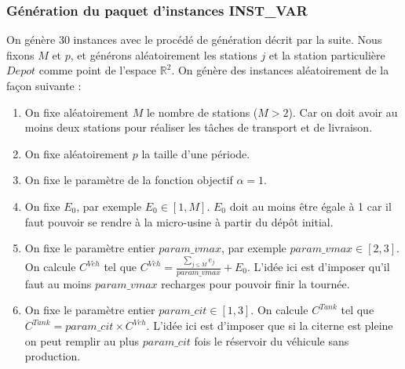 {\subsubsection{Génération du paquet d'instances INST\_VAR}
On génère 30 instances avec le procédé de génération décrit par la suite.
 Nous fixons $M$ et $p$, et générons aléatoirement les stations $j$ et la station particulière $Depot$ comme point de l'espace $\mathbb{R}^2$.  
 On génère des instances aléatoirement de la façon suivante :

\begin{enumerate}
	\item On fixe aléatoirement $M$ le nombre de stations ($M>2$). Car on doit avoir au moins deux stations pour réaliser les tâches de transport et de livraison.
	\item On fixe aléatoirement $p$ la taille d'une période.
	\item On fixe le paramètre de la fonction objectif $\alpha=1$.%
	\item On fixe $E_0$, par exemple $E_0 \in [1, M]$. $E_0$ doit au moins être égale à 1 car il faut pouvoir se rendre à la micro-usine à partir du dépôt initial.
	\item On fixe le paramètre entier $param\_vmax$, par exemple $param\_vmax \in [2,3]$. On calcule $C^{Veh}$ tel que $C^{Veh}= \frac{\sum_{j \leq M} e_j }{ param\_vmax} +E_0$. L'idée ici est d'imposer qu'il faut au moins $param\_vmax$ recharges pour pouvoir finir la tournée.
	\item On fixe le paramètre entier $param\_cit \in [1,3]$. On calcule $C^{Tank}$ tel que $C^{Tank}=param\_cit \times C^{Veh}$. L'idée ici est d'imposer que si la citerne est pleine on peut remplir au plus $param\_cit$ fois le réservoir du véhicule sans production. 
	

\end{enumerate}}
